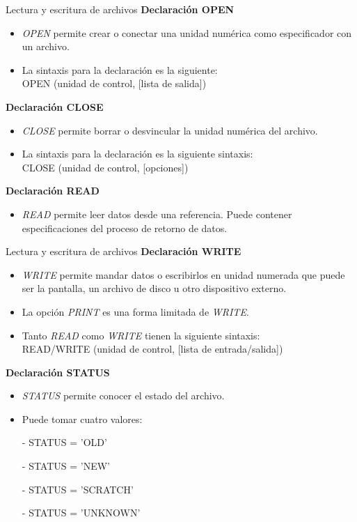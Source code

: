 \begin{frame}[fragile]{Lectura y escritura de archivos}    
\textbf{Declaración OPEN}
  \begin{itemize}[<+(1)->]
    \item \emph{OPEN} permite crear o conectar una unidad numérica como especificador con un archivo.
    \item La sintaxis para la declaración es la siguiente:\\ 
      \centering OPEN (unidad de control, [lista de salida])
  \end{itemize}
\textbf{Declaración CLOSE}
  \begin{itemize}[<+(2)->]
    \item \emph{CLOSE} permite borrar o desvincular la unidad numérica del archivo.
    \item La sintaxis para la declaración es la siguiente sintaxis:\\ 
      \centering CLOSE (unidad de control, [opciones])
  \end{itemize}
\textbf{Declaración READ}
  \begin{itemize}[<+(3)->]
    \item \emph{READ} permite leer datos desde una referencia. Puede contener especificaciones del proceso de retorno de datos.
  \end{itemize}
\end{frame}

\begin{frame}[fragile]{Lectura y escritura de archivos}
 \textbf{Declaración WRITE}
  \begin{itemize}[<+(1)->]
    \item \emph{WRITE} permite mandar datos o escribirlos en unidad numerada que puede ser la pantalla, un archivo de disco u otro dispositivo externo.
    \item La opción \emph{PRINT} es una forma limitada de \emph{WRITE}.
    \item Tanto \emph{READ} como \emph{WRITE} tienen la siguiente sintaxis:\\ 
    \centering READ/WRITE (unidad de control, [lista de entrada/salida])
  \end{itemize}
 \textbf{Declaración STATUS}
  \begin{itemize}[<+(2)->]
    \item \emph{STATUS} permite conocer el estado del archivo.
    \item Puede tomar cuatro valores: 
    \item [-] STATUS = 'OLD'
    \item [-] STATUS = 'NEW'
    \item [-] STATUS = 'SCRATCH'
    \item [-] STATUS = 'UNKNOWN'
  \end{itemize}
\end{frame}

